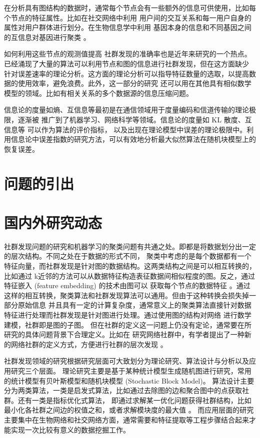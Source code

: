 在分析具有图结构的数据时，通常每个节点会有一些额外的信息可供使用，比如每个节点的特征属性。比如在社交网络中利用
用户间的交互关系和每一用户自身的属性对用户群体进行划分。在生物信息学中利用
基因本身的信息和不同基因之间的互信息对基因进行聚类 \cite{4359897}。

如何利用这些节点的观测值提高
社群发现的准确率也是近年来研究的一个热点。已经涌现了大量的算法可以利用节点和图的信息进行社群发现，但在这方面缺少
针对误差速率的理论分析。这方面的理论分析可以指导特征数量的选取，以提高数据的使用效率，避免浪费。此外，这一部分的研究
还可以用在其他具有相似数学模型的领域。比如有相关关系的多个数据源的信息压缩问题。

信息论的度量如熵、互信息等最初是在通信领域用于度量编码和信道传输的理论极限，逐渐被
推广到了机器学习、网络科学等领域。信息论的度量如 KL 散度、互信息等 可以作为算法的评价指标，
以及出现在理论模型中误差的理论极限中。利用信息论中误差指数的研究方法，可以有效地分析最大似然算法在随机块模型上的
恢复误差。

\section{问题的引出}

\section{国内外研究动态}
社群发现问题的研究和机器学习的聚类问题有共通之处。即都是将数据划分出一定的层次结构。不同之处在于数据的形式不同，
聚类中考虑的是每个数据都有一个特征向量，而社群发现是针对图的数据结构。这两类结构之间是可以相互转换的，比如通过
k近邻的方法可以从数据特征构造表征数据间相似程度的图。反之，通过特征嵌入 (feature embedding) 的技术由图可以
获取每个节点的数据特征 \cite{hamilton2017representation}。通过这样的相互转换，聚类算法和社群发现算法可以通用。但由于这种转换会损失掉一部分原始信息
并且具有一定的计算复杂度，通常意义上的聚类算法直接针对数据特征进行处理而社群发现是针对图进行处理。通过使用图的结构对网络
进行数学建模，社群即是图的子图。
但在社群的定义这一问题上仍没有定论，通常要在所研究的具体问题背景下合理定义。比如在
研究网络社群中，有学者提出了一种新的网络社群的定义方式，方便进行社群的层次发现
\cite{alphabetaclustering2019}。

社群发现领域的研究根据研究层面可大致划分为理论研究、算法设计与分析以及应用研究三个层面。
理论研究主要是基于某种统计模型生成随机图进行研究，常用的统计模型有贝叶斯模型和随机块模型 (Stochastic Block Model)。
算法设计主要分为两类算法，一类是启发式算法，比如通过去除图的边和聚合图中的点获取社群。还有一类是指标优化式算法，
即通过求解某一优化问题获得社群结构，比如最小化各社群之间边的权值之和，或者求解模块度的最大值 \cite{newman2006modularity}。
而应用层面的研究主要集中在生物网络和社交网络方面，通常需要和特征提取等工程步骤结合起来才能实现一次比较有意义的数据挖掘工作。

